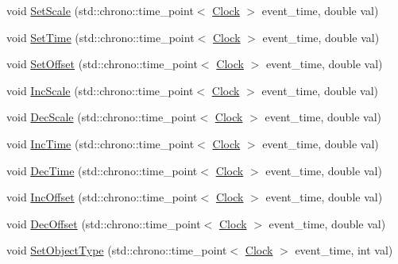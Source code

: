 \begin{DoxyCompactItemize}
\item 
void \mbox{\hyperlink{classDimension_a7f655ea002e8f9614a8c5cfa1807c49c}{Set\+Scale}} (std\+::chrono\+::time\+\_\+point$<$ \mbox{\hyperlink{universe_8h_a0ef8d951d1ca5ab3cfaf7ab4c7a6fd80}{Clock}} $>$ event\+\_\+time, double val)
\item 
void \mbox{\hyperlink{classDimension_a0558d45fe020ba1d1895e521a411decb}{Set\+Time}} (std\+::chrono\+::time\+\_\+point$<$ \mbox{\hyperlink{universe_8h_a0ef8d951d1ca5ab3cfaf7ab4c7a6fd80}{Clock}} $>$ event\+\_\+time, double val)
\item 
void \mbox{\hyperlink{classDimension_af74dd7af3af95c0a51b001b6ad665300}{Set\+Offset}} (std\+::chrono\+::time\+\_\+point$<$ \mbox{\hyperlink{universe_8h_a0ef8d951d1ca5ab3cfaf7ab4c7a6fd80}{Clock}} $>$ event\+\_\+time, double val)
\item 
void \mbox{\hyperlink{classDimension_aa323eaa2c592e498d48e0739009ec313}{Inc\+Scale}} (std\+::chrono\+::time\+\_\+point$<$ \mbox{\hyperlink{universe_8h_a0ef8d951d1ca5ab3cfaf7ab4c7a6fd80}{Clock}} $>$ event\+\_\+time, double val)
\item 
void \mbox{\hyperlink{classDimension_a4bd8e584c3bb68ebd7ca0463f8905813}{Dec\+Scale}} (std\+::chrono\+::time\+\_\+point$<$ \mbox{\hyperlink{universe_8h_a0ef8d951d1ca5ab3cfaf7ab4c7a6fd80}{Clock}} $>$ event\+\_\+time, double val)
\item 
void \mbox{\hyperlink{classDimension_afc61c6d6d68ec0ed461458d504fec16f}{Inc\+Time}} (std\+::chrono\+::time\+\_\+point$<$ \mbox{\hyperlink{universe_8h_a0ef8d951d1ca5ab3cfaf7ab4c7a6fd80}{Clock}} $>$ event\+\_\+time, double val)
\item 
void \mbox{\hyperlink{classDimension_a25978bcb1f62aa7ed909463d08d92ca4}{Dec\+Time}} (std\+::chrono\+::time\+\_\+point$<$ \mbox{\hyperlink{universe_8h_a0ef8d951d1ca5ab3cfaf7ab4c7a6fd80}{Clock}} $>$ event\+\_\+time, double val)
\item 
void \mbox{\hyperlink{classDimension_aaf18cc220562b30f9e7aee92f16cc08e}{Inc\+Offset}} (std\+::chrono\+::time\+\_\+point$<$ \mbox{\hyperlink{universe_8h_a0ef8d951d1ca5ab3cfaf7ab4c7a6fd80}{Clock}} $>$ event\+\_\+time, double val)
\item 
void \mbox{\hyperlink{classDimension_a2017e62d4b3caf31f4f1b6b5cf59a798}{Dec\+Offset}} (std\+::chrono\+::time\+\_\+point$<$ \mbox{\hyperlink{universe_8h_a0ef8d951d1ca5ab3cfaf7ab4c7a6fd80}{Clock}} $>$ event\+\_\+time, double val)
\item 
void \mbox{\hyperlink{classDimension_a484621a7c6f9b43f6e251ba04e0fdf8b}{Set\+Object\+Type}} (std\+::chrono\+::time\+\_\+point$<$ \mbox{\hyperlink{universe_8h_a0ef8d951d1ca5ab3cfaf7ab4c7a6fd80}{Clock}} $>$ event\+\_\+time, int val)

\end{DoxyCompactItemize}
